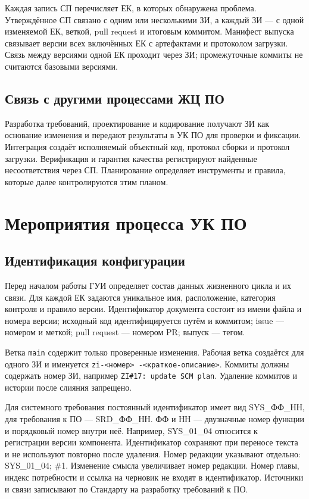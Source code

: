 \documentclass{tpks}
\begin{document}
Каждая запись СП перечисляет ЕК, в которых обнаружена проблема. Утверждённое СП
связано с одним или несколькими ЗИ, а каждый ЗИ --- с одной изменяемой ЕК,
веткой, pull request и итоговым коммитом. Манифест выпуска связывает версии всех
включённых ЕК с артефактами и протоколом загрузки. Связь между версиями одной ЕК
проходит через ЗИ; промежуточные коммиты не считаются базовыми версиями.

\subsection{Связь с другими процессами ЖЦ ПО}

Разработка требований, проектирование и кодирование получают ЗИ как основание
изменения и передают результаты в УК ПО для проверки и фиксации. Интеграция
создаёт исполняемый объектный код, протокол сборки и протокол загрузки. Верификация
и гарантия качества регистрируют найденные несоответствия через СП. Планирование
определяет инструменты и правила, которые далее контролируются этим планом.

\section{Мероприятия процесса УК ПО}

\subsection{Идентификация конфигурации}

Перед началом работы ГУИ определяет состав данных жизненного цикла и их связи.
Для каждой ЕК задаются уникальное имя, расположение, категория контроля и правило
версии. Идентификатор документа состоит из имени файла и номера версии; исходный
код идентифицируется путём и коммитом; issue --- номером и меткой; pull request
--- номером PR; выпуск --- тегом.

Ветка \texttt{main} содержит только проверенные изменения. Рабочая ветка
создаётся для одного ЗИ и именуется \texttt{zi-\textless номер\textgreater
-\textless краткое-описание\textgreater}. Коммиты должны содержать номер ЗИ,
например \texttt{ZI\#17: update SCM plan}. Удаление коммитов и истории после
слияния запрещено.

Для системного требования постоянный идентификатор имеет вид SYS_ФФ_НН, для требования к ПО --- SRD_ФФ_НН. ФФ и НН --- двузначные номер функции и порядковый номер внутри неё. Например, SYS_01_04 относится к регистрации версии компонента. Идентификатор сохраняют при переносе текста и не используют повторно после удаления. Номер редакции указывают отдельно: SYS_01_04; \#1. Изменение смысла увеличивает номер редакции. Номер главы, индекс потребности и ссылка на черновик не входят в идентификатор. Источники и связи записывают по Стандарту на разработку требований к ПО.
\end{document}
